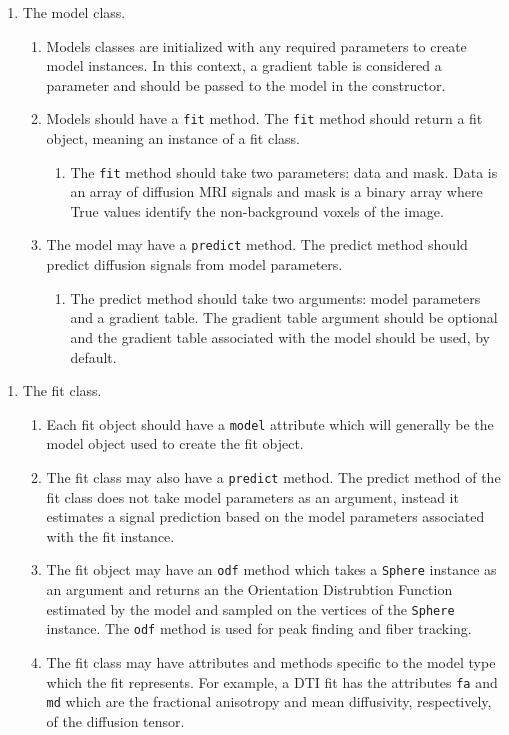 \begin{enumerate}
\item The model class.
\begin{enumerate}
\item Models classes are initialized with any required parameters to create model instances. In this context, a gradient table is considered a parameter and should be passed to the model in the constructor.
\item Models should have a \verb|fit| method. The \verb|fit| method should return a fit object, meaning an instance of a fit class.
\begin{enumerate}
\item The \verb|fit| method should take two parameters: data and mask. Data is an array of diffusion MRI signals and mask is a binary array where True values identify the non-background voxels of the image.
\end{enumerate}
\item The model may have a \verb|predict| method. The predict method should predict diffusion signals from model parameters.
\begin{enumerate}
\item The predict method should take two arguments: model parameters and a gradient table. The gradient table argument should be optional and the gradient table associated with the model should be used, by default.
\end{enumerate}
\end{enumerate}
\end{enumerate}
\begin{enumerate}
    \item The fit class.
    \begin{enumerate}
        \item Each fit object should have a \verb|model| attribute which will generally be the model object used to create the fit object.
        \item The fit class may also have a \verb|predict| method. The predict method of the fit class does not take model parameters as an argument, instead it estimates a signal prediction based on the model parameters associated with the fit instance.
        \item The fit object may have an \verb|odf| method which takes a \verb|Sphere| instance as an argument and returns an the Orientation Distrubtion Function estimated by the model and sampled on the vertices of the \verb|Sphere| instance. The \verb|odf| method is used for peak finding and fiber tracking.
        \item The fit class may have attributes and methods specific to the model type which the fit represents. For example, a DTI fit has the attributes \verb|fa| and \verb|md| which are the fractional anisotropy and mean diffusivity, respectively, of the diffusion tensor.
    \end{enumerate}
\end{enumerate}

